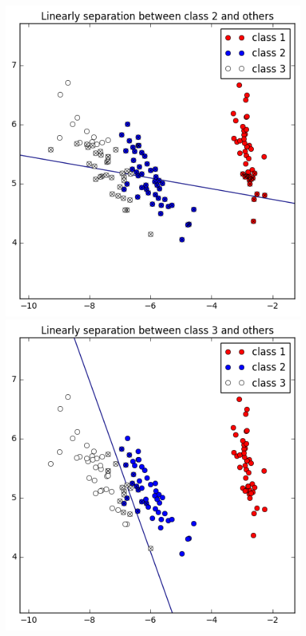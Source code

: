 \documentclass[a4paper,11pt]{article}
\begin{document}
\begin{figure}[htbp]
  \includegraphics[scale=0.3]{l2_13.png}
  \includegraphics[scale=0.3]{l3_12.png}
\end{figure}
\end{document}
